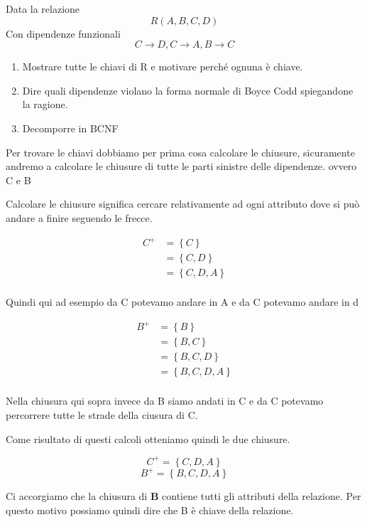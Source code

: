 \begin{exmp}
    Data la relazione 
    \[R(A,B,C,D)\]
    Con dipendenze funzionali
    \[ C \rightarrow D,C \rightarrow A,B \rightarrow C \]
    
    \begin{enumerate}
        \item Mostrare tutte le chiavi di R e motivare perché ognuna è chiave.
        \item Dire quali dipendenze violano la forma normale di Boyce Codd spiegandone la ragione.
        \item Decomporre in BCNF
    \end{enumerate}
    
    Per trovare le chiavi dobbiamo per prima cosa calcolare le chiusure, sicuramente andremo a calcolare le chiusure di tutte le parti sinistre delle dipendenze. ovvero C e B

    Calcolare le chiusure significa cercare relativamente ad ogni attributo dove si può andare a finire seguendo le frecce.

    \begin{equation} \label{eq1}
        \begin{split}
            C^+&= \left\{ C \right\} \\
            &= \left\{ C,D \right\}  \\
            &= \left\{ C,D,A \right\}  \\
        \end{split}
    \end{equation}

    Quindi qui ad esempio da C potevamo andare in A e da C potevamo andare in d

    \begin{equation} \label{eq1}
        \begin{split}
            B^+&= \left\{  B \right\}\\
            &= \left\{  B,C \right\}\\
            &= \left\{  B,C,D \right\}\\
            &= \left\{  B,C,D,A \right\}\\
        \end{split}
    \end{equation}

    Nella chiusura qui sopra invece da B siamo andati in C e da C potevamo percorrere tutte le strade della ciusura di C.

    Come risultato di questi calcoli otteniamo quindi le due chiusure.

    \[C^+= \left\{ C,D,A \right\} \] \[ B^+= \left\{  B,C,D,A \right\}\]

    Ci accorgiamo che la chiusura di \textbf{B} contiene tutti gli attributi della relazione. Per questo motivo possiamo quindi dire che B è chiave della relazione.

\end{exmp}
